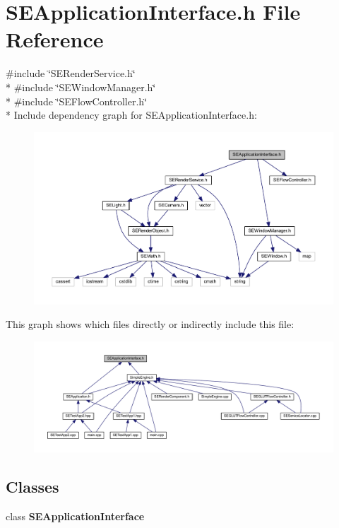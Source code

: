 \section{S\+E\+Application\+Interface.\+h File Reference}
\label{_s_e_application_interface_8h}
{\ttfamily \#include \char`\"{}S\+E\+Render\+Service.\+h\char`\"{}}\\*
{\ttfamily \#include \char`\"{}S\+E\+Window\+Manager.\+h\char`\"{}}\\*
{\ttfamily \#include \char`\"{}S\+E\+Flow\+Controller.\+h\char`\"{}}\\*
Include dependency graph for S\+E\+Application\+Interface.\+h\+:
\nopagebreak
\begin{figure}[H]
\begin{center}
\leavevmode
\includegraphics[width=350pt]{_s_e_application_interface_8h__incl}
\end{center}
\end{figure}
This graph shows which files directly or indirectly include this file\+:
\nopagebreak
\begin{figure}[H]
\begin{center}
\leavevmode
\includegraphics[width=350pt]{_s_e_application_interface_8h__dep__incl}
\end{center}
\end{figure}
\subsection*{Classes}
\begin{DoxyCompactItemize}
\item 
class {\bf S\+E\+Application\+Interface}
\end{DoxyCompactItemize}
